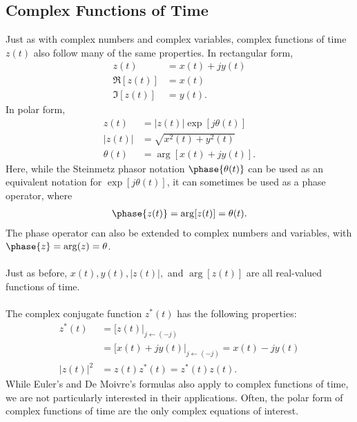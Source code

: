 \documentclass{report}
\begin{document}
\subsection*{Complex Functions of Time}
Just as with complex numbers and complex variables, complex functions of time $z(t)$ also follow many of the same properties. In rectangular form,
\begin{align}
    z(t)&=x(t)+jy(t) \\
    \Re[z(t)] &= x(t) \\
    \Im[z(t)] &= y(t).
\end{align}
In polar form,
\begin{align}
    z(t)&=|z(t)|\exp[{j\theta(t)}] \\
    |z(t)| &= \sqrt{x^2(t)+y^2(t)} \\
    \theta(t) &= \arg[x(t)+jy(t)].
\end{align}
Here, while the Steinmetz phasor notation $\phase{\theta(t)}$ can be used as an equivalent notation for $\exp[{j\theta(t)}]$, it can sometimes be used as 
a phase operator, where
\begin{align}
    \phase{z(t)} = \arg[z(t)] = \theta(t).
\end{align}
The phase operator can also be extended to complex numbers and variables, with $\phase{z}=\arg(z)=\theta$.
\\ \\
Just as before, $x(t),y(t),|z(t)|,$ and $\arg[z(t)]$ are all real-valued functions of time. 
\\ \\
The complex conjugate function $z^*(t)$ has the following properties:
\begin{align}
    z^*(t) &= [z(t)|_{j\leftarrow (-j)} \\
    &= [x(t)+jy(t)|_{j\leftarrow (-j)} = x(t) - jy(t) \\
    |z(t)|^2 &= z(t)z^*(t) = z^*(t)z(t).
\end{align}
While Euler's and De Moivre's formulas also apply to complex functions of time, we are not particularly interested in their applications. 
Often, the polar form of complex functions of time are the only complex equations of interest. 
\end{document}
